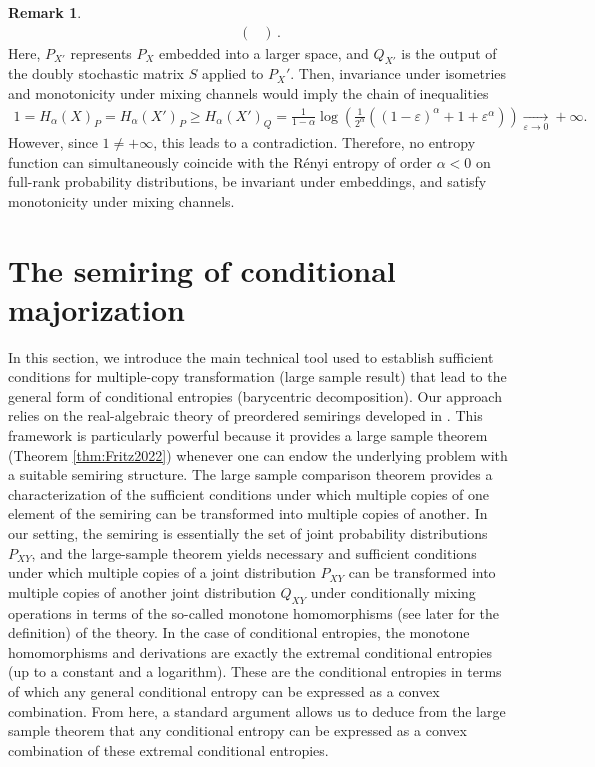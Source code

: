 \documentclass[aps,pra,11pt,onecolumn,nofootinbib,tightenlines]{revtex4-2}
\theoremstyle{definition}
\newtheorem{remark}[theorem]{Remark}
\begin{document}
\begin{remark}
\begin{align}
\begin{pmatrix}
       \end{pmatrix} \,.
    \end{align}
Here, $P_{X'}$ represents $P_X$ embedded into a larger space, and $Q_{X'}$ is the output of the doubly stochastic matrix $S$ applied to $P_X'$. Then, invariance under isometries and monotonicity under mixing channels would imply the chain of inequalities
    \begin{align}
        1= H_\alpha(X)_P = H_\alpha(X')_P \geq H_\alpha(X')_Q = \frac{1}{1-\alpha}\log{\left(\frac{1}{2^\alpha}\left((1-\varepsilon)^{\alpha}+1+\varepsilon^\alpha\right)\right)} \xrightarrow[\varepsilon \to 0]{} +\infty.
    \end{align}
However, since $1 \neq  +\infty$, this leads to a contradiction. Therefore, no entropy function can simultaneously coincide with the Rényi entropy of order $\alpha < 0$ on full-rank probability distributions, be invariant under embeddings, and satisfy monotonicity under mixing channels.
\end{remark}

\section{The semiring of conditional majorization}
\label{sec: semiring of conditional entropies}
In this section, we introduce the main technical tool used to establish sufficient conditions for multiple-copy transformation (large sample result) that lead to the general form of conditional entropies (barycentric decomposition). Our approach relies on the real-algebraic theory of preordered semirings developed in \cite{fritz2023abstract,fritz2023abstractII}. This framework is particularly powerful because it provides a large sample theorem (Theorem \ref{thm:Fritz2022}) whenever one can endow the underlying problem with a suitable semiring structure.
The large sample comparison theorem provides a characterization of the sufficient conditions under which multiple copies of one element of the semiring can be transformed into multiple copies of another. 
In our setting, the semiring is essentially the set of joint probability distributions $P_{XY}$, and the large-sample theorem yields necessary and sufficient conditions under which multiple copies of a joint distribution $P_{XY}$ can be transformed into multiple copies of another joint distribution $Q_{XY}$ under conditionally mixing operations in terms of the so-called monotone homomorphisms (see later for the definition) of the theory. In the case of conditional entropies, the monotone homomorphisms and derivations are exactly the extremal conditional entropies (up to a constant and a logarithm). These are the conditional entropies in terms of which any general conditional entropy can be expressed as a convex combination. From here, a standard argument \cite{mu21_renyi,haapasalo_inprep} allows us to deduce from the large sample theorem that any conditional entropy can be expressed as a convex combination of these extremal conditional entropies.
\end{document}

